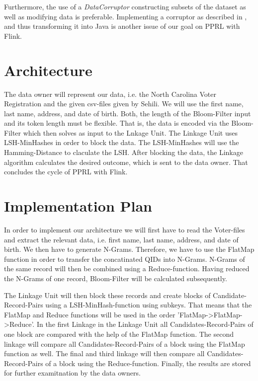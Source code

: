 \documentclass[10pt]{article}
\begin{document}
            Furthermore, the use of a \textit{DataCorruptor} constructing subsets of the dataset as well as
            modifying data is preferable. Implementing a corruptor as described in \cite{DataCorruptor}, and thus transforming
            it into Java is another issue of our goal on PPRL with Flink.


    \section{Architecture}


        The data owner will represent our data, i.e. the North Carolina Voter Registration and the
        given csv-files given by Sehili. We will use the first name, last name, address, and date of birth.
        Both, the length of the Bloom-Filter input and its token length must be flexible. That is, the data is encoded
        via the Bloom-Filter which then solves as input to the Lnkage Unit.
        The Linkage Unit uses LSH-MinHashes in order to block the data. The LSH-MinHashes will use the Hamming-Distance
        to claculate the LSH. After blocking the data, the Linkage algorithm calculates the desired outcome,
        which is sent to the data owner. That concludes the cycle of PPRL with Flink.

    \section{Implementation Plan}


        In order to implement our architecture we will first have to read the Voter-files and
        extract the relevant data, i.e. first name, last name, address, and date of birth.
        We then have to generate N-Grams. Therefore, we have to use the FlatMap function
        in order to transfer the concatinated QIDs into N-Grams. N-Grams of the same record will then be
        combined using a Reduce-function.
        Having reduced the N-Grams of one record, Bloom-Filter will be calculated subsequently.

        The Linkage Unit will then block these records and create blocks of Candidate-Record-Pairs
        using a LSH-MinHash-function using subkeys. That means that the FlatMap and Reduce functions will be used in
        the order 'FlatMap->FlatMap->Reduce'.
        In the first Linkage in the Linkage Unit all Candidates-Record-Pairs of one block are
        compared with the help of the FlatMap function.
        The second linkage will compare all Candidates-Record-Pairs of a block using the
        FlatMap function as well. The final and third linkage will then compare all
        Candidates-Record-Pairs of a block using the Reduce-function.
        Finally, the results are stored for further examitnation by the data owners.


        \newpage

        
        
\end{document}
